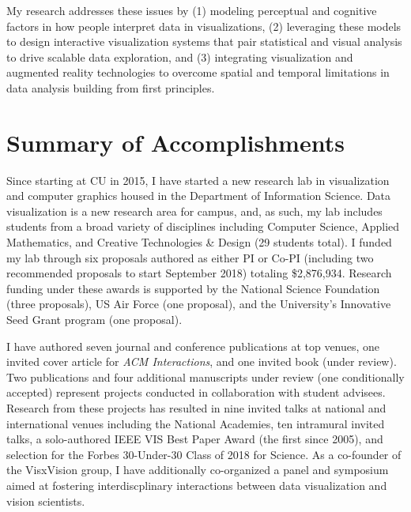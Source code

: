 \documentclass[11pt]{article}
\begin{document}
My research addresses these issues by (1) modeling perceptual and cognitive factors in how people interpret data in visualizations, (2) leveraging these models to design interactive visualization systems that pair statistical and visual analysis to drive scalable data exploration, and (3) integrating visualization and augmented reality technologies to overcome spatial and temporal limitations in data analysis building from first principles.

\section*{Summary of Accomplishments}

Since starting at CU in 2015, I have started a new research lab in visualization and computer graphics housed in the Department of Information Science. Data visualization is a new research area for campus, and, as such, my lab includes students from a broad variety of disciplines including Computer Science, Applied Mathematics, and Creative Technologies \& Design (29 students total). I funded my lab through six proposals authored as either PI or Co-PI (including two recommended proposals to start September 2018) totaling \$2,876,934. Research funding under these awards is supported by the National Science Foundation (three proposals), US Air Force (one proposal), and the University's Innovative Seed Grant program (one proposal). 


I have authored seven journal and conference publications at top venues, one invited cover article for \emph{ACM Interactions}, and one invited book (under review). Two publications and four additional manuscripts under review (one conditionally accepted) represent projects conducted in collaboration with student advisees. Research from these projects has resulted in nine invited talks at national and international venues including the National Academies, ten intramural invited talks, a solo-authored IEEE VIS Best Paper Award (the first since 2005), and selection for the Forbes 30-Under-30 Class of 2018 for Science.  As a co-founder of the VisxVision group, I have additionally co-organized a panel and symposium aimed at fostering interdiscplinary interactions between data visualization and vision scientists. 
\end{document}
